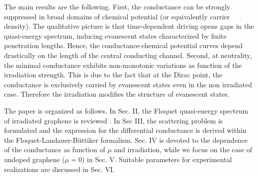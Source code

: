 \documentclass[aps,prb,showpacs,superscriptaddress,twocolumn,10pt,floatfix]{revtex4-1}
\begin{document}




The main results are the following. First, the conductance can be strongly suppressed in broad domains of chemical potential (or equivalently carrier density). The qualitative picture is that time-dependent driving opens gaps in the quasi-energy spectrum, inducing evanescent states characterized by finite penetration lengths. Hence, the conductance-chemical potential curves depend drastically on the length of the central conducting channel. Second, at neutrality, the minimal conductance exhibits non-monotonic variations as function of the irradiation strength. This is due to the fact that at the Dirac point, the conductance is exclusively carried by evanescent states even in the non irradiated case. Therefore the irradiation modifies the structure of evanescent states. 

The paper is organized as follows. In Sec. II, the Floquet quasi-energy spectrum of irradiated graphene is reviewed  \cite{Zhou2011,Oka2009,Usaj2014,Perez-Piskunow2015,Gu2011}. In Sec III, the scattering problem is formulated and the expression for the differential conductance is derived within the Floquet-Landauer-B\"{u}ttiker formalism. Sec. IV is devoted to the dependence of the conductance as function of $\mu$ and irradiation, while we focus on the case of undoped graphene ($\mu=0$) in Sec. V. Suitable parameters for experimental realizations are discussed in Sec. VI.      
\end{document}
